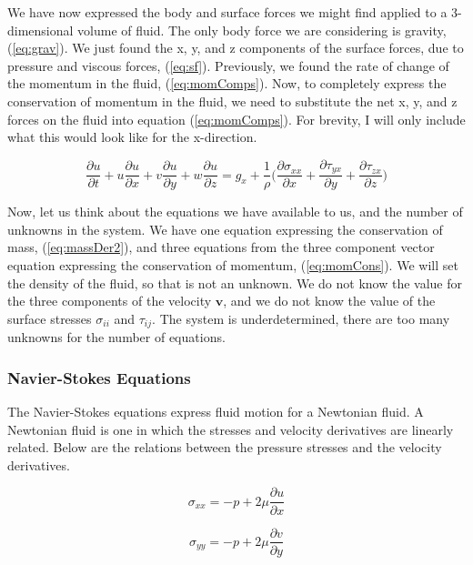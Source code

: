 \documentclass[twocolumn,12pth]{article}
\begin{document}
We have now expressed the body and surface forces we might find applied to a 3-dimensional volume of fluid. 
The only body force we are considering is gravity, (\ref{eq:grav}).
We just found the x, y, and z components of the surface forces, due to pressure and viscous forces, (\ref{eq:sf}).
Previously, we found the rate of change of the momentum in the fluid, (\ref{eq:momComps}).
Now, to completely express the conservation of momentum in the fluid, we need to substitute the net x, y, and z forces on the fluid into equation (\ref{eq:momComps}).
For brevity, I will only include what this would look like for the x-direction.

\begin{equation}
\frac{\partial{u}}{\partial{t}} + u\frac{\partial{u}}{\partial{x}} + v\frac{\partial{u}}{\partial{y}} + w\frac{\partial{u}}{\partial{z}} = g_x + \frac{1}{\rho} \bigg(\frac{\partial{\sigma_{xx}}}{\partial{x}} + \frac{\partial{\tau_{yx}}}{\partial{y}} + \frac{\partial{\tau_{zx}}}{\partial{z}} \bigg)
\label{eq:momCons}
\end{equation}

Now, let us think about the equations we have available to us, and the number of unknowns in the system.
We have one equation expressing the conservation of mass, (\ref{eq:massDer2}), and three equations from the three component vector equation expressing the conservation of momentum, (\ref{eq:momCons}).
We will set the density of the fluid, so that is not an unknown.
We do not know the value for the three components of the velocity $\mathbf{v}$, and we do not know the value of the surface stresses $\sigma_{ii}$ and $\tau_{ij}$.
The system is underdetermined, there are too many unknowns for the number of equations.


\subsubsection{Navier-Stokes Equations}

The Navier-Stokes equations express fluid motion for a Newtonian fluid.
A Newtonian fluid is one in which the stresses and velocity derivatives are linearly related.
Below are the relations between the pressure stresses and the velocity derivatives.

\begin{equation}
\sigma_{xx} = -p + 2\mu\frac{\partial{u}}{\partial{x}}
\end{equation}

\begin{equation*}
\sigma_{yy} = -p + 2\mu\frac{\partial{v}}{\partial{y}}
\end{equation*}
\end{document}
